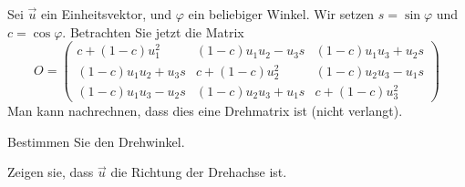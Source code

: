 Sei $\vec u$ ein Einheitsvektor, und $\varphi$ ein beliebiger Winkel.
Wir setzen $s=\sin\varphi$ und $c=\cos\varphi$. Betrachten Sie jetzt
die Matrix
\[
O=\begin{pmatrix}
c+(1-c)u_1^2    &(1-c)u_1u_2-u_3s   &(1-c)u_1u_3+u_2s\\
(1-c)u_1u_2+u_3s&c+(1-c)u_2^2       &(1-c)u_2u_3-u_1s\\
(1-c)u_1u_3-u_2s&(1-c)u_2u_3+u_1s   &c+(1-c)u_3^2
\end{pmatrix}
\]
Man kann nachrechnen, dass dies eine Drehmatrix ist (nicht verlangt).
\begin{teilaufgaben}
\item Bestimmen Sie den Drehwinkel.
\item Zeigen sie, dass $\vec u$ die Richtung der Drehachse ist.
\end{teilaufgaben}


